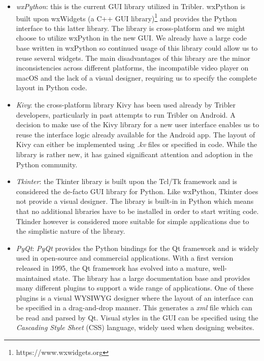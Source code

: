 \begin{itemize}
	\item \emph{wxPython}\cite{rappin2006wxpython}: this is the current GUI library utilized in Tribler. wxPython is built upon wxWidgets (a C++ GUI library)\footnote{https://www.wxwidgets.org} and provides the Python interface to this latter library. The library is cross-platform and we might choose to utilize wxPython in the new GUI. We already have a large code base written in wxPython so continued usage of this library could allow us to reuse several widgets. The main disadvantages of this library are the minor inconsistencies across different platforms, the incompatible video player on macOS and the lack of a visual designer, requiring us to specify the complete layout in Python code.
	\item \emph{Kivy}\cite{solis2015kivy}: the cross-platform library Kivy has been used already by Tribler developers, particularly in past attempts to run Tribler on Android\cite{de2014android}\cite{sabee2014tribler}. A decision to make use of the Kivy library for a new user interface enables us to reuse the interface logic already available for the Android app. The layout of Kivy can either be implemented using \emph{.kv} files or specified in code. While the library is rather new, it has gained significant attention and adoption in the Python community.
	\item \emph{Tkinter}\cite{lundh1999introduction}: the Tkinter library is built upon the Tcl/Tk framework and is considered the de-facto GUI library for Python. Like wxPython, Tkinter does not provide a visual designer. The library is built-in in Python which means that no additional libraries have to be installed in order to start writing code. Tkinder however is considered more suitable for simple applications due to the simplistic nature of the library.
	\item \emph{PyQt}\cite{summerfield2007rapid}: \emph{PyQt} provides the Python bindings for the Qt framework and is widely used in open-source and commercial applications. With a first version released in 1995, the Qt framework has evolved into a mature, well-maintained state. The library has a large documentation base and provides many different plugins to support a wide range of applications. One of these plugins is a visual WYSIWYG designer where the layout of an interface can be specified in a drag-and-drop manner. This generates a \emph{xml} file which can be read and parsed by Qt. Visual styles in the GUI can be specified using the \emph{Cascading Style Sheet} (CSS) language, widely used when designing websites.
\end{itemize}
